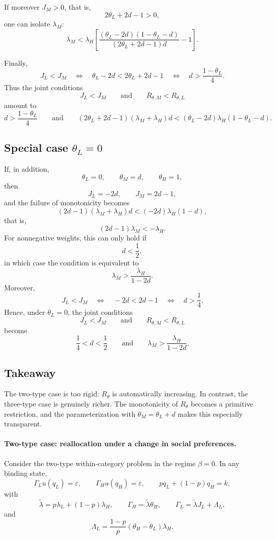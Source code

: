 \documentclass[11pt]{article}
\begin{document}
If moreover $J_M>0$, that is,
\[
2\theta_L+2d-1>0,
\]
one can isolate $\lambda_M$:
\[
\boxed{
\lambda_M
<
\lambda_H
\left[
\frac{(\theta_L-2d)(1-\theta_L-d)}{(2\theta_L+2d-1)d}-1
\right].
}
\]

Finally,
\[
J_L<J_M
\quad\Longleftrightarrow\quad
\theta_L-2d<2\theta_L+2d-1
\quad\Longleftrightarrow\quad
d>\frac{1-\theta_L}{4}.
\]
Thus the joint conditions
\[
J_L<J_M
\qquad\text{and}\qquad
R_{\theta,M}<R_{\theta,L}
\]
amount to
\[
\boxed{
d>\frac{1-\theta_L}{4}
\qquad\text{and}\qquad
(2\theta_L+2d-1)(\lambda_M+\lambda_H)d
<
(\theta_L-2d)\lambda_H(1-\theta_L-d).
}
\]

\subsection{ Special case $\theta_L=0$}

If, in addition,
\[
\theta_L=0,
\qquad
\theta_M=d,
\qquad
\theta_H=1,
\]
then
\[
J_L=-2d,
\qquad
J_M=2d-1,
\]
and the failure of monotonicity becomes
\[
(2d-1)(\lambda_M+\lambda_H)d
<
(-2d)\lambda_H(1-d),
\]
that is,
\[
\boxed{(2d-1)\lambda_M< -\lambda_H.}
\]
For nonnegative weights, this can only hold if
\[
d<\frac12,
\]
in which case the condition is equivalent to
\[
\boxed{\lambda_M>\frac{\lambda_H}{1-2d}.}
\]
Moreover,
\[
J_L<J_M
\quad\Longleftrightarrow\quad
-2d<2d-1
\quad\Longleftrightarrow\quad
d>\frac14.
\]
Hence, under $\theta_L=0$, the joint conditions
\[
J_L<J_M
\qquad\text{and}\qquad
R_{\theta,M}<R_{\theta,L}
\]
become
\[
\boxed{
\frac14<d<\frac12
\qquad\text{and}\qquad
\lambda_M>\frac{\lambda_H}{1-2d}.
}
\]

\subsection{Takeaway}

The two-type case is too rigid: $R_\theta$ is automatically increasing. In contrast, the three-type case is genuinely richer. The monotonicity of $R_\theta$ becomes a primitive restriction, and the parameterization with $\theta_M=\theta_L+d$ makes this especially transparent.

\paragraph{Two-type case: reallocation under a change in social preferences.}

Consider the two-type within-category problem in the regime \(\beta=0\). In any binding state,
\[
\Gamma_L u(q_L)=\varepsilon,
\qquad
\Gamma_H u(q_H)=\varepsilon,
\qquad
p q_L+(1-p)q_H = k,
\]
with
\[
\tilde\lambda = p\lambda_L + (1-p)\lambda_H,
\qquad
\Gamma_H = \tilde\lambda \theta_H,
\qquad
\Gamma_L = \tilde\lambda J_L + \Lambda_L,
\]
and
\[
\Lambda_L = \frac{1-p}{p}\left(\theta_H-\theta_L\right)\lambda_H.
\]
\end{document}
